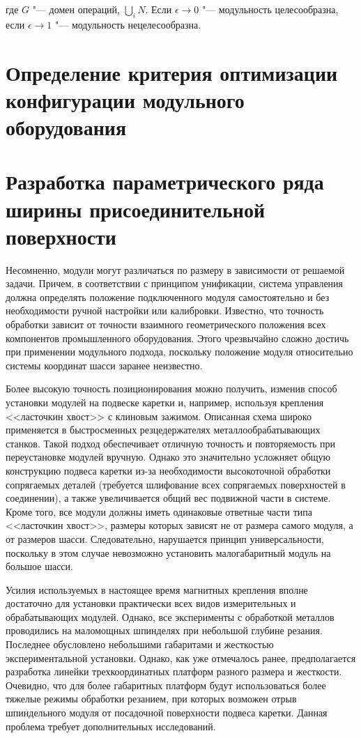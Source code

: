 \noindent где $G$ "--- домен операций, $\bigcup\limits_{i} N$. Если $\epsilon\rightarrow 0$ "--- модульность целесообразна, если $\epsilon\rightarrow 1$ "--- модульность нецелесообразна.

\section{Определение критерия оптимизации конфигурации модульного оборудования}

\section{Разработка параметрического ряда ширины присоединительной поверхности}

Несомненно, модули могут различаться по размеру в зависимости от решаемой задачи. Причем, в соответствии с принципом унификации, система управления должна определять положение подключенного модуля самостоятельно и без необходимости ручной настройки или калибровки. Известно, что точность обработки зависит от точности взаимного геометрического положения всех компонентов промышленного оборудования. Этого чрезвычайно сложно достичь при применении модульного подхода, поскольку положение модуля относительно системы координат шасси заранее неизвестно.

Более высокую точность позиционирования можно получить, изменив способ установки модулей на подвеске каретки и, например, используя крепления <<ласточкин хвост>> с клиновым зажимом. Описанная схема широко применяется в быстросменных резцедержателях металлообрабатывающих станков. Такой подход обеспечивает отличную точность и повторяемость при переустановке модулей вручную. Однако это значительно усложняет общую конструкцию подвеса каретки из-за необходимости высокоточной обработки сопрягаемых деталей (требуется шлифование всех сопрягаемых поверхностей в соединении), а также увеличивается общий вес подвижной части в системе. Кроме того, все модули должны иметь одинаковые ответные части типа <<ласточкин хвост>>, размеры которых зависят не от размера самого модуля, а от размеров шасси. Следовательно, нарушается принцип универсальности, поскольку в этом случае невозможно установить малогабаритный модуль на большое шасси.

Усилия используемых в настоящее время магнитных крепления вполне достаточно для установки практически всех видов измерительных и обрабатывающих модулей. Однако, все эксперименты с обработкой металлов проводились на маломощных шпинделях при небольшой глубине резания. Последнее обусловлено небольшими габаритами и жесткостью экспериментальной установки. Однако, как уже отмечалось ранее, предполагается разработка линейки трехкоординатных платформ разного размера и жесткости. Очевидно, что для более габаритных платформ будут использоваться более тяжелые режимы обработки резанием, при которых возможен отрыв шпиндельного модуля от посадочной поверхности подвеса каретки. Данная проблема требует дополнительных исследований.

